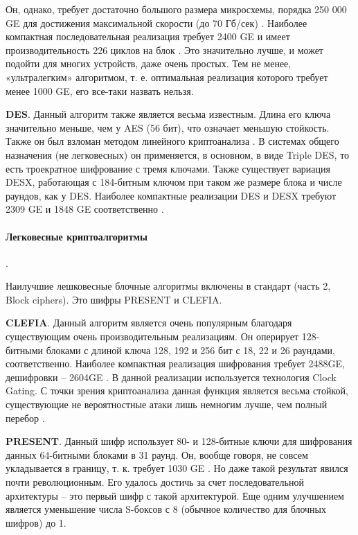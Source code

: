 Он, однако, требует достаточно большого размера микросхемы, порядка 250 000 GE  для достижения максимальной скорости (до 70 Гб/сек) \cite{src33}. Наиболее компактная последовательная реализация требует 2400 GE  и имеет производительность 226 циклов на блок \cite{src34}. Это значительно лучше, и может подойти для многих устройств, даже очень простых. Тем не менее, «ультралегким» алгоритмом, т. е. оптимальная реализация которого требует менее 1000 GE, его все-таки назвать нельзя.

\textbf{DES}. Данный алгоритм также является весьма известным. Длина его ключа значительно меньше, чем у AES (56 бит), что означает меньшую стойкость. Также он был взломан методом линейного криптоанализа \cite{src35}. В системах общего назначения (не легковесных) он применяется, в основном, в виде Triple DES, то есть троекратное шифрование с тремя ключами. Также существует вариация DESX, работающая с 184-битным ключом при таком же размере блока и числе раундов, как у DES. Наиболее компактные реализации DES и DESX требуют 2309 GE и 1848 GE соответственно \cite{src36}.

\paragraph{Легковесные криптоалгоритмы}. \newline

Наилучшие лешковесные блочные алгоритмы включены в стандарт \cite{src26} (часть 2, Block ciphers). Это шифры PRESENT и CLEFIA.

\textbf{CLEFIA}. Данный алгоритм является очень популярным благодаря существующим очень производительным реализациям. Он оперирует 128-битными блоками с длиной ключа 128, 192 и 256 бит с 18, 22 и 26 раундами, соответственно. Наиболее компактная реализация шифрования требует 2488GE, дешифровки – 2604GE \cite{src37}. В данной реализации используется технология Clock Gating. С точки зрения криптоанализа данная функция является весьма стойкой, существующие не вероятностные атаки лишь немногим лучше, чем полный перебор \cite{src38}.

\textbf{PRESENT}. Данный шифр использует 80- и 128-битные ключи для шифрования данных 64-битными блоками в 31 раунд. Он, вообще говоря, не совсем укладывается в границу, т. к. требует 1030 GE \cite{src39}. Но даже такой результат явился почти революционным. Его удалось достичь за счет последовательной архитектуры – это первый шифр с такой архитектурой. Еще одним улучшением является уменьшение числа S-боксов с 8 (обычное количество для блочных шифров) до 1.

